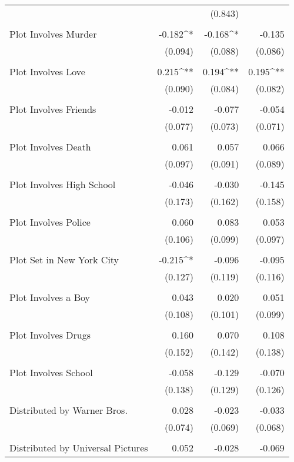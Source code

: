 \documentclass{article}
\begin{document}
\begin{table}[!htbp]
\begin{tabular}{@{\extracolsep{5pt}}lD{.}{.}{-3} D{.}{.}{-3} D{.}{.}{-3}}
  &  & (0.843) &  \\ 
  & & & \\ 
 Plot Involves Murder & -0.182^{*} & -0.168^{*} & -0.135 \\ 
  & (0.094) & (0.088) & (0.086) \\ 
  & & & \\ 
 Plot Involves Love & 0.215^{**} & 0.194^{**} & 0.195^{**} \\ 
  & (0.090) & (0.084) & (0.082) \\ 
  & & & \\ 
 Plot Involves Friends & -0.012 & -0.077 & -0.054 \\ 
  & (0.077) & (0.073) & (0.071) \\ 
  & & & \\ 
 Plot Involves Death & 0.061 & 0.057 & 0.066 \\ 
  & (0.097) & (0.091) & (0.089) \\ 
  & & & \\ 
 Plot Involves High School & -0.046 & -0.030 & -0.145 \\ 
  & (0.173) & (0.162) & (0.158) \\ 
  & & & \\ 
 Plot Involves Police & 0.060 & 0.083 & 0.053 \\ 
  & (0.106) & (0.099) & (0.097) \\ 
  & & & \\ 
 Plot Set in New York City & -0.215^{*} & -0.096 & -0.095 \\ 
  & (0.127) & (0.119) & (0.116) \\ 
  & & & \\ 
 Plot Involves a Boy & 0.043 & 0.020 & 0.051 \\ 
  & (0.108) & (0.101) & (0.099) \\ 
  & & & \\ 
 Plot Involves Drugs & 0.160 & 0.070 & 0.108 \\ 
  & (0.152) & (0.142) & (0.138) \\ 
  & & & \\ 
 Plot Involves School & -0.058 & -0.129 & -0.070 \\ 
  & (0.138) & (0.129) & (0.126) \\ 
  & & & \\ 
 Distributed by Warner Bros. & 0.028 & -0.023 & -0.033 \\ 
  & (0.074) & (0.069) & (0.068) \\ 
  & & & \\ 
 Distributed by Universal Pictures & 0.052 & -0.028 & -0.069 \\ 

\end{tabular}
\end{table}
\end{document}
